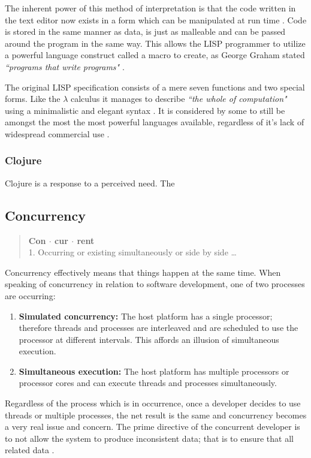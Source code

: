 \documentclass[12pt,a4paper]{article}
\begin{document}
The inherent power of this method of interpretation is that the code written in the text editor now exists in a form which can be manipulated at run time \cite{lispPart1}. Code is stored in the same manner as data, is just as malleable and can be passed around the program in the same way. This allows the LISP programmer to utilize a powerful language construct called a macro to create, as George Graham stated \textit{``programs that write programs"} \cite{beatingTheAverages}.

The original LISP specification consists of a mere seven functions and two special forms. Like the $\lambda$ calculus it manages to describe \textit{``the whole of computation"} \cite{joyOfClojure} using a minimalistic and elegant syntax \cite{lispPart1}. It is considered by some to still be amongst the most the most powerful languages available, regardless of it's lack of widespread commercial use \cite{beatingTheAverages,joyOfClojure}.

\subsubsection{Clojure}

Clojure is a response to a perceived need. The 

\subsection{Concurrency}

\begin{quote}
  \textbf{Con $\cdot$ cur $\cdot$ rent} \\
  1. Occurring or existing simultaneously or side by side \ldots\\
  \cite{concurrentDef}
\end{quote}

Concurrency effectively means that things happen at the same time. When speaking of concurrency in relation to software development, one of two processes are occurring:

\begin{enumerate} \itemsep0pt
        \item \textbf{Simulated concurrency:} The host platform has a single processor; therefore threads and processes are interleaved and are scheduled to use the processor at different intervals. This affords an illusion of simultaneous execution.
        \item \textbf{Simultaneous execution:} The host platform has multiple processors or processor cores and can execute threads and processes simultaneously.
\end{enumerate}
Regardless of the process which is in occurrence, once a developer decides to use threads or multiple processes, the net result is the same and concurrency becomes a very real issue and concern. The prime directive of the concurrent developer is to not allow the system to produce inconsistent data; that is to ensure that all related data  \cite{javaConcurrency}.
\end{document}
